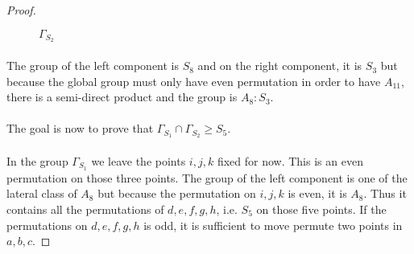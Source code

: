 \begin{proof}
\begin{figure}[H]
\begin{center}
      \caption{$\Gamma_{S_2}$}
    \end{center}
  \end{figure}

  \paragraph{}
  The group of the left component is $S_8$ and on the right component, it is $S_3$ but because the global group must only have even permutation in order to have $A_{11}$, there is a semi-direct product and the group is $A_8 : S_3$.

  \paragraph{}
  The goal is now to prove that $\Gamma_{S_1} \cap \Gamma_{S_2} \ge S_5$.

  \paragraph{}
  In the group $\Gamma_{S_1}$ we leave the points $i,j,k$ fixed for now. This is an even permutation on those three points. The group of the left component is one of the lateral class of $A_8$ but because the permutation on $i,j,k$ is even, it is $A_8$. Thus it contains all the permutations of $d,e,f,g,h$, i.e. $S_5$ on those five points. If the permutations on $d,e,f,g,h$ is odd, it is sufficient to move permute two points in $a,b,c$.


\end{proof}
